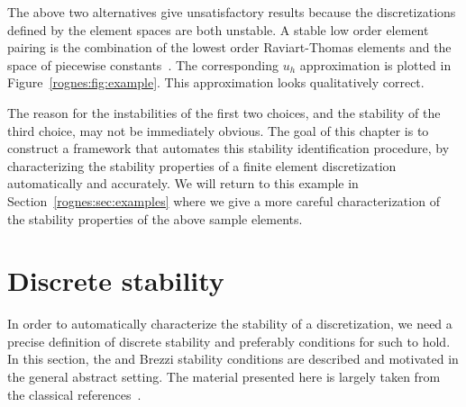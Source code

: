 The above two alternatives give unsatisfactory results because
the discretizations defined by the element spaces are both
unstable. A stable low order element pairing is the combination of
the lowest order Raviart-Thomas elements and the space of piecewise
constants~\citep{RaviartThomas1977}. The corresponding $u_h$ approximation
is plotted in Figure~\ref{rognes:fig:example}. This
approximation looks qualitatively correct.

The reason for the instabilities of the first two choices, and the
stability of the third choice, may not be immediately obvious. The
goal of this chapter is to construct a framework that automates this
stability identification procedure, by characterizing the stability
properties of a finite element discretization automatically and
accurately.  We will return to this example in
Section~\ref{rognes:sec:examples} where we give a more careful
characterization of the stability properties of the above sample
elements.



\section{Discrete stability}

In order to automatically characterize the stability of a
discretization, we need a precise definition of discrete stability and
preferably conditions for such to hold. In this section,
the \babuska{} and Brezzi stability conditions are described and
motivated in the general abstract setting. The material presented here
is largely taken from the classical references~\citep{Babuvska1972/73,
Brezzi1974, BrezziFortin1991}.

